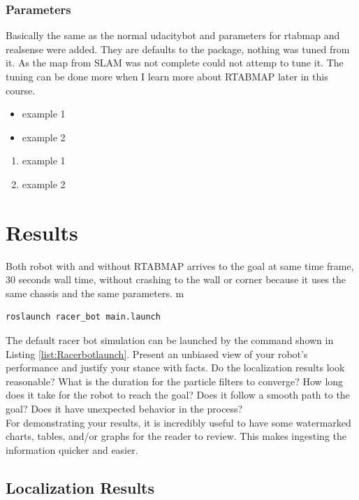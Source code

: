 \documentclass[10pt,journal,compsoc]{IEEEtran}
\begin{document}
\subsubsection{Parameters}
Basically the same as the normal udacitybot and parameters for rtabmap and realsense were added. They are defaults to the package, nothing was tuned from it. 
As the map from SLAM was not complete could not attemp to tune it. The tuning can be done more when I learn more about RTABMAP later in this course.
\begin{itemize}
      \item example 1
      \item example 2
      \end {itemize}
      
      \begin{enumerate}
      \item example 1
      \item example 2
      \end{enumerate}

\section{Results}
Both robot with and without RTABMAP arrives to the goal at same time frame, 30 seconds wall time, without crashing to the wall or corner because it uses the same chassis and the same parameters.
m
\begin{lstlisting}[language={[Sharp]C}, caption={racerbot launch command},label={list:Racerbotlaunch}]
      roslaunch racer_bot main.launch
\end{lstlisting}
The default racer bot simulation can be launched by the command shown in Listing \ref{list:Racerbotlaunch}.
Present an unbiased view of your robot's performance and justify your stance with facts. Do the localization results look reasonable? What is the duration for the particle filters to converge? How long does it take for the robot to reach the goal? Does it follow a smooth path to the goal? Does it have unexpected behavior in the process? \\
For demonstrating your results, it is incredibly useful to have some watermarked charts, tables, and/or graphs for the reader to review. This makes ingesting the information quicker and easier.
\subsection{Localization Results}
\end{document}
